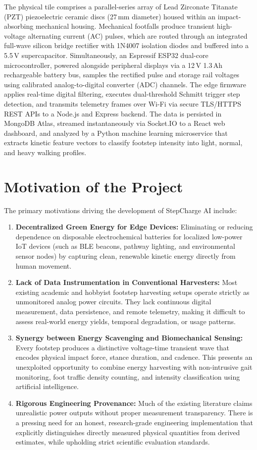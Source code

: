 The physical tile comprises a parallel-series array of Lead Zirconate Titanate (PZT) piezoelectric ceramic discs (27\,mm diameter) housed within an impact-absorbing mechanical housing. Mechanical footfalls produce transient high-voltage alternating current (AC) pulses, which are routed through an integrated full-wave silicon bridge rectifier with 1N4007 isolation diodes and buffered into a 5.5\,V supercapacitor. Simultaneously, an Espressif ESP32 dual-core microcontroller, powered alongside peripheral displays via a 12\,V 1.3\,Ah rechargeable battery bus, samples the rectified pulse and storage rail voltages using calibrated analog-to-digital converter (ADC) channels. The edge firmware applies real-time digital filtering, executes dual-threshold Schmitt trigger step detection, and transmits telemetry frames over Wi-Fi via secure TLS/HTTPS REST APIs to a Node.js and Express backend. The data is persisted in MongoDB Atlas, streamed instantaneously via Socket.IO to a React web dashboard, and analyzed by a Python machine learning microservice that extracts kinetic feature vectors to classify footstep intensity into light, normal, and heavy walking profiles.

\section{Motivation of the Project}
The primary motivations driving the development of StepCharge AI include:
\begin{enumerate}
    \item \textbf{Decentralized Green Energy for Edge Devices:} Eliminating or reducing dependence on disposable electrochemical batteries for localized low-power IoT devices (such as BLE beacons, pathway lighting, and environmental sensor nodes) by capturing clean, renewable kinetic energy directly from human movement.
    \item \textbf{Lack of Data Instrumentation in Conventional Harvesters:} Most existing academic and hobbyist footstep harvesting setups operate strictly as unmonitored analog power circuits. They lack continuous digital measurement, data persistence, and remote telemetry, making it difficult to assess real-world energy yields, temporal degradation, or usage patterns.
    \item \textbf{Synergy between Energy Scavenging and Biomechanical Sensing:} Every footstep produces a distinctive voltage-time transient wave that encodes physical impact force, stance duration, and cadence. This presents an unexploited opportunity to combine energy harvesting with non-intrusive gait monitoring, foot traffic density counting, and intensity classification using artificial intelligence.
    \item \textbf{Rigorous Engineering Provenance:} Much of the existing literature claims unrealistic power outputs without proper measurement transparency. There is a pressing need for an honest, research-grade engineering implementation that explicitly distinguishes directly measured physical quantities from derived estimates, while upholding strict scientific evaluation standards.
\end{enumerate}

